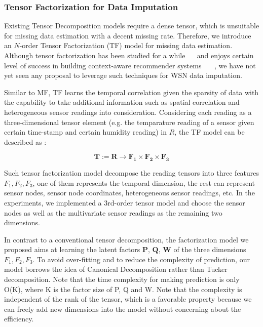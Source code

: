 \subsubsection{Tensor Factorization for Data Imputation} \label{sec:tfmissing}

Existing Tensor Decomposition models require a dense tensor, which is unsuitable for missing data estimation with a decent missing rate. 
Therefore, we introduce an $N$-order Tensor Factorization (TF) model for missing data estimation. Although tensor factorization has been studied for a while ~\cite{tg2009td}~\cite{bergqvist2010hosvd} and enjoys certain level of success in building context-aware recommender systems ~\cite{karatzoglou2010multiverse}~\cite{steffen2010pairwise}~\cite{zeno2010context}, we have not yet seen any proposal to leverage such techniques for WSN data imputation.

Similar to MF, TF learns the temporal correlation given the sparsity of data with the capability to take additional information such as spatial correlation and heterogeneous sensor readings into consideration.
Considering each reading as a three-dimensional tensor element (e.g. the temparature reading of a sensor given certain time-stamp and certain humidity reading) in $R$, the TF model can be described as :

\begin{equation*}
\mathbf{T} := \mathbf{R} \rightarrow \mathbf{F_1} \times  \mathbf{F_2} \times \mathbf{F_3} 
\end{equation*}

Such tensor factorization model decompose the reading tensors into three features $F_1, F_2 , F_3$, one of them represents the temporal dimension, the rest can represent sensor nodes, sensor node coordinates, heterogeneous sensor readings, etc. In the experiments, we implemented a 3rd-order tensor model and choose the sensor nodes as well as the multivariate sensor readings as the remaining two dimensions.

In contrast to a conventional tensor decomposition, the factorization model we proposed aims at learning the latent factors $\mathbf{P}$,  $\mathbf{Q}$, $\mathbf{W}$ of the three dimensions $F_1, F_2, F_3$.
To avoid over-fitting and to reduce the complexity of prediction, our model borrows the idea of Canonical Decomposition rather than Tucker decomposition. Note that the time complexity for making prediction is only O(K), where K is the factor size of  P, Q and W. Note that the complexity is independent of the rank of the tensor, which is a favorable property because we can freely add new dimensions into the model without concerning about the efficiency.

